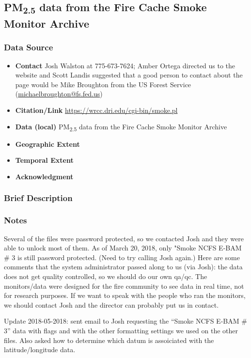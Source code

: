 \clearpage
\subsection{\texorpdfstring{PM\textsubscript{2.5}}{} data from the Fire Cache Smoke Monitor Archive}

\subsubsection*{Data Source}

\begin{itemize}[nolistsep]
\item \textbf{Contact} Josh Walston at 775-673-7624; Amber Ortega directed us to the website and Scott Landis suggested that a good person to contact about the page would be Mike Broughton from the US Forest Service (\url{michaelbroughton@fs.fed.us})
\item \textbf{Citation/Link} \url{https://wrcc.dri.edu/cgi-bin/smoke.pl}
\item \textbf{Data (local)} PM\textsubscript{2.5} data from the Fire Cache Smoke Monitor Archive
\item \textbf{Geographic Extent}
\item \textbf{Temporal Extent}
\item \textbf{Acknowledgment}
\end{itemize}

\subsubsection*{Brief Description}

\subsubsection*{Notes}

Several of the files were password protected, so we contacted Josh and they were able to unlock most of them. As of March 20, 2018, only "Smoke NCFS E-BAM \# 3 is still password protected. (Need to try calling Josh again.) Here are some comments that the system administrator passed along to us (via Josh): the data does not get quality controlled, so we should do our own qa/qc. The monitors/data were designed for the fire community to see data in real time, not for research purposes. If we want to speak with the people who ran the monitors, we should contact Josh and the director can probably put us in contact.

Update 2018-05-2018: sent email to Josh requesting the ``Smoke NCFS E-BAM \# 3'' data with flags and with the other formatting settings we used on the other files. Also asked how to determine which datum is assoiciated with the latitude/longitude data.

